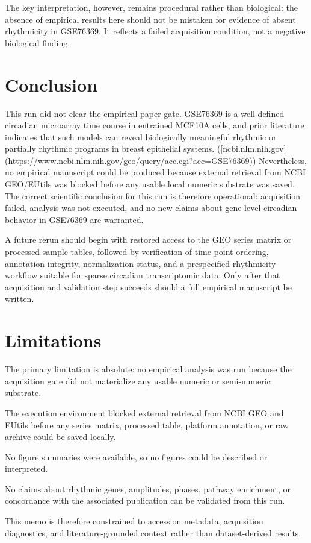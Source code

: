 \documentclass[11pt]{article}
\begin{document}
The key interpretation, however, remains procedural rather than biological: the absence of empirical results here should not be mistaken for evidence of absent rhythmicity in GSE76369. It reflects a failed acquisition condition, not a negative biological finding.

\section{Conclusion}
This run did not clear the empirical paper gate. GSE76369 is a well-defined circadian microarray time course in entrained MCF10A cells, and prior literature indicates that such models can reveal biologically meaningful rhythmic or partially rhythmic programs in breast epithelial systems. ([ncbi.nlm.nih.gov](https://www.ncbi.nlm.nih.gov/geo/query/acc.cgi?acc=GSE76369)) Nevertheless, no empirical manuscript could be produced because external retrieval from NCBI GEO/EUtils was blocked before any usable local numeric substrate was saved. The correct scientific conclusion for this run is therefore operational: acquisition failed, analysis was not executed, and no new claims about gene-level circadian behavior in GSE76369 are warranted.

A future rerun should begin with restored access to the GEO series matrix or processed sample tables, followed by verification of time-point ordering, annotation integrity, normalization status, and a prespecified rhythmicity workflow suitable for sparse circadian transcriptomic data. Only after that acquisition and validation step succeeds should a full empirical manuscript be written.

\section{Limitations}
The primary limitation is absolute: no empirical analysis was run because the acquisition gate did not materialize any usable numeric or semi-numeric substrate.

The execution environment blocked external retrieval from NCBI GEO and EUtils before any series matrix, processed table, platform annotation, or raw archive could be saved locally.

No figure summaries were available, so no figures could be described or interpreted.

No claims about rhythmic genes, amplitudes, phases, pathway enrichment, or concordance with the associated publication can be validated from this run.

This memo is therefore constrained to accession metadata, acquisition diagnostics, and literature-grounded context rather than dataset-derived results.



\end{document}
